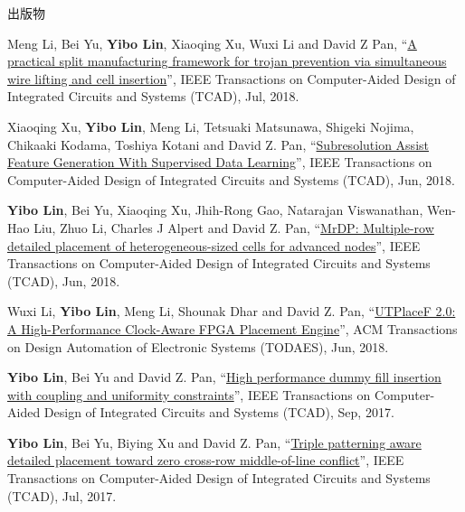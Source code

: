 \begin{rSection}{出版物}
\begin{description}[font=\normalfont, rightmargin=2em]
{}
            

\item[{[J11]}]{
        Meng Li, Bei Yu, \textbf{Yibo Lin}, Xiaoqing Xu, Wuxi Li and David Z Pan, 
    ``\href{https://doi.org/10.1109/TCAD.2018.2859402}{A practical split manufacturing framework for trojan prevention via simultaneous wire lifting and cell insertion}'', 
    IEEE Transactions on Computer-Aided Design of Integrated Circuits and Systems (TCAD), Jul, 2018.
    
}
            

\item[{[J10]}]{
        Xiaoqing Xu, \textbf{Yibo Lin}, Meng Li, Tetsuaki Matsunawa, Shigeki Nojima, Chikaaki Kodama, Toshiya Kotani and David Z. Pan, 
    ``\href{https://doi.org/10.1109/TCAD.2017.2748029}{Subresolution Assist Feature Generation With Supervised Data Learning}'', 
    IEEE Transactions on Computer-Aided Design of Integrated Circuits and Systems (TCAD), Jun, 2018.
    
}
            

\item[{[J9]}]{
        \textbf{Yibo Lin}, Bei Yu, Xiaoqing Xu, Jhih-Rong Gao, Natarajan Viswanathan, Wen-Hao Liu, Zhuo Li, Charles J Alpert and David Z. Pan, 
    ``\href{https://doi.org/10.1109/TCAD.2017.2748025}{MrDP: Multiple-row detailed placement of heterogeneous-sized cells for advanced nodes}'', 
    IEEE Transactions on Computer-Aided Design of Integrated Circuits and Systems (TCAD), Jun, 2018.
    
}
            

\item[{[J8]}]{
        Wuxi Li, \textbf{Yibo Lin}, Meng Li, Shounak Dhar and David Z. Pan, 
    ``\href{https://doi.org/10.1145/3174849}{UTPlaceF 2.0: A High-Performance Clock-Aware FPGA Placement Engine}'', 
    ACM Transactions on Design Automation of Electronic Systems (TODAES), Jun, 2018.
    
}
            

\item[{[J7]}]{
        \textbf{Yibo Lin}, Bei Yu and David Z. Pan, 
    ``\href{http://dx.doi.org/10.1109/TCAD.2016.2638452}{High performance dummy fill insertion with coupling and uniformity constraints}'', 
    IEEE Transactions on Computer-Aided Design of Integrated Circuits and Systems (TCAD), Sep, 2017.
    
}
            

\item[{[J6]}]{
        \textbf{Yibo Lin}, Bei Yu, Biying Xu and David Z. Pan, 
    ``\href{http://dx.doi.org/10.1109/TCAD.2017.2648843}{Triple patterning aware detailed placement toward zero cross-row middle-of-line conflict}'', 
    IEEE Transactions on Computer-Aided Design of Integrated Circuits and Systems (TCAD), Jul, 2017.
    
}
\end{description}
\end{rSection}
